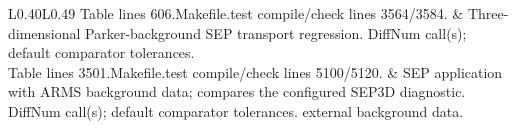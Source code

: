 \begin{longtable}{L{0.40\textwidth}L{0.49\textwidth}}
\newline Table lines 606.\newline Makefile.test compile/check lines 3564/3584. & Three-dimensional Parker-background SEP transport regression. DiffNum call(s); default comparator tolerances. \\
\newline Table lines 3501.\newline Makefile.test compile/check lines 5100/5120. & SEP application with ARMS background data; compares the configured SEP3D diagnostic. DiffNum call(s); default comparator tolerances. \newline external background data.\\
\bottomrule
\end{longtable}
